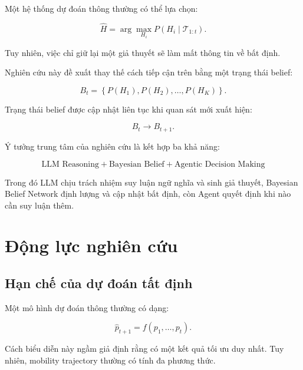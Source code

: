 \documentclass[11pt,a4paper]{article}
\begin{document}
	Một hệ thống dự đoán thông thường có thể lựa chọn:
	
	\begin{equation}
		\hat{H}
		=
		\arg\max_{H_i} P(H_i\mid\mathcal{T}_{1:t}).
	\end{equation}
	
	Tuy nhiên, việc chỉ giữ lại một giả thuyết sẽ làm mất thông tin về bất
	định.
	
	Nghiên cứu này đề xuất thay thế cách tiếp cận trên bằng một trạng thái
	belief:
	
	\begin{equation}
		B_t
		=
		\left\{
		P(H_1),
		P(H_2),
		\ldots,
		P(H_K)
		\right\}.
	\end{equation}
	
	Trạng thái belief được cập nhật liên tục khi quan sát mới xuất hiện:
	
	\begin{equation}
		B_t
		\rightarrow
		B_{t+1}.
	\end{equation}
	
	Ý tưởng trung tâm của nghiên cứu là kết hợp ba khả năng:
	
	\begin{equation}
		\boxed{
			\text{LLM Reasoning}
			+
			\text{Bayesian Belief}
			+
			\text{Agentic Decision Making}
		}
	\end{equation}
	
	Trong đó LLM chịu trách nhiệm suy luận ngữ nghĩa và sinh giả thuyết,
	Bayesian Belief Network định lượng và cập nhật bất định, còn Agent quyết
	định khi nào cần suy luận thêm.
	
	\section{Động lực nghiên cứu}
	
	\subsection{Hạn chế của dự đoán tất định}
	
	Một mô hình dự đoán thông thường có dạng:
	
	\begin{equation}
		\hat{p}_{t+1}
		=
		f
		\left(
		p_1,\ldots,p_t
		\right).
	\end{equation}
	
	Cách biểu diễn này ngầm giả định rằng có một kết quả tối ưu duy nhất.
	Tuy nhiên, mobility trajectory thường có tính đa phương thức.
	
\end{document}
